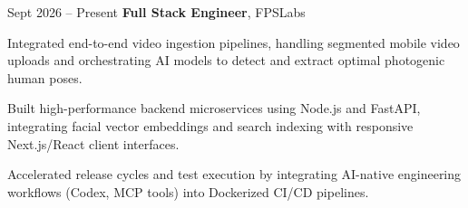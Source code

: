 \begin{twocolentry}{
            Sept 2026 – Present
        }
\textbf{Full Stack Engineer}, FPSLabs\end{twocolentry}

\vspace{0.10 cm}
\begin{onecolentry}
    \begin{highlights}
        \item Integrated end-to-end video ingestion pipelines, handling segmented mobile video uploads and orchestrating AI models to detect and extract optimal photogenic human poses.
        \item Built high-performance backend microservices using Node.js and FastAPI, integrating facial vector embeddings and search indexing with responsive Next.js/React client interfaces.
        \item Accelerated release cycles and test execution by integrating AI-native engineering workflows (Codex, MCP tools) into Dockerized CI/CD pipelines.
    \end{highlights}
\end{onecolentry}
